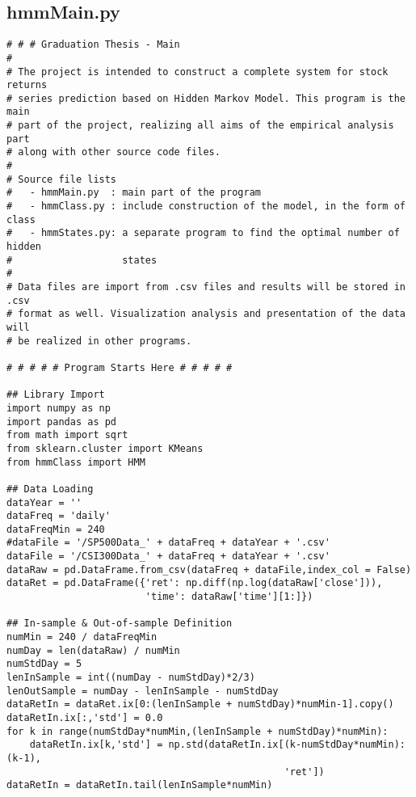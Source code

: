 \newpage
\begin{spacing}{1.2}
\section{hmmMain.py}
\label{sec:code:main}
\begin{lstlisting}
# # # Graduation Thesis - Main
#
# The project is intended to construct a complete system for stock returns
# series prediction based on Hidden Markov Model. This program is the main 
# part of the project, realizing all aims of the empirical analysis part 
# along with other source code files.
#
# Source file lists
#   - hmmMain.py  : main part of the program
#   - hmmClass.py : include construction of the model, in the form of class
#   - hmmStates.py: a separate program to find the optimal number of hidden
#                   states
#
# Data files are import from .csv files and results will be stored in .csv
# format as well. Visualization analysis and presentation of the data will
# be realized in other programs.
 
# # # # # Program Starts Here # # # # #

## Library Import
import numpy as np
import pandas as pd
from math import sqrt
from sklearn.cluster import KMeans
from hmmClass import HMM

## Data Loading
dataYear = ''
dataFreq = 'daily'
dataFreqMin = 240
#dataFile = '/SP500Data_' + dataFreq + dataYear + '.csv'
dataFile = '/CSI300Data_' + dataFreq + dataYear + '.csv'
dataRaw = pd.DataFrame.from_csv(dataFreq + dataFile,index_col = False)
dataRet = pd.DataFrame({'ret': np.diff(np.log(dataRaw['close'])),
                        'time': dataRaw['time'][1:]})
                        
## In-sample & Out-of-sample Definition
numMin = 240 / dataFreqMin
numDay = len(dataRaw) / numMin
numStdDay = 5
lenInSample = int((numDay - numStdDay)*2/3)
lenOutSample = numDay - lenInSample - numStdDay
dataRetIn = dataRet.ix[0:(lenInSample + numStdDay)*numMin-1].copy()
dataRetIn.ix[:,'std'] = 0.0
for k in range(numStdDay*numMin,(lenInSample + numStdDay)*numMin):
    dataRetIn.ix[k,'std'] = np.std(dataRetIn.ix[(k-numStdDay*numMin):(k-1),
                                                'ret'])
dataRetIn = dataRetIn.tail(lenInSample*numMin)


\end{lstlisting}
\end{spacing}
